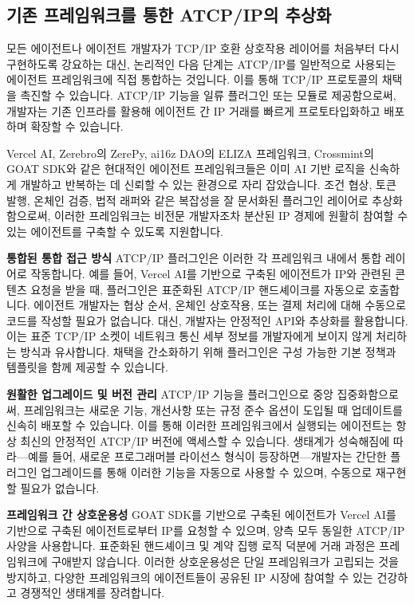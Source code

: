 \documentclass[journal,onecolumn]{IEEEtran} %
\begin{document}
\subsection{기존 프레임워크를 통한 ATCP/IP의 추상화}

모든 에이전트나 에이전트 개발자가 TCP/IP 호환 상호작용 레이어를 처음부터 다시 구현하도록 강요하는 대신, 논리적인 다음 단계는 ATCP/IP를 일반적으로 사용되는 에이전트 프레임워크에 직접 통합하는 것입니다. 이를 통해 TCP/IP 프로토콜의 채택을 촉진할 수 있습니다. ATCP/IP 기능을 일류 플러그인 또는 모듈로 제공함으로써, 개발자는 기존 인프라를 활용해 에이전트 간 IP 거래를 빠르게 프로토타입화하고 배포하며 확장할 수 있습니다.

Vercel AI\cite{ref8}, Zerebro의 ZerePy\cite{ref9}, ai16z DAO의 ELIZA 프레임워크\cite{ref7}, Crossmint의 GOAT SDK\cite{ref10}와 같은 현대적인 에이전트 프레임워크들은 이미 AI 기반 로직을 신속하게 개발하고 반복하는 데 신뢰할 수 있는 환경으로 자리 잡았습니다. 조건 협상, 토큰 발행, 온체인 검증, 법적 래퍼와 같은 복잡성을 잘 문서화된 플러그인 레이어로 추상화함으로써, 이러한 프레임워크는 비전문 개발자조차 분산된 IP 경제에 원활히 참여할 수 있는 에이전트를 구축할 수 있도록 지원합니다.


\noindent\textbf{통합된 통합 접근 방식}
ATCP/IP 플러그인은 이러한 각 프레임워크 내에서 통합 레이어로 작동합니다. 예를 들어, Vercel AI를 기반으로 구축된 에이전트가 IP와 관련된 콘텐츠 요청을 받을 때, 플러그인은 표준화된 ATCP/IP 핸드셰이크를 자동으로 호출합니다. 에이전트 개발자는 협상 순서, 온체인 상호작용, 또는 결제 처리에 대해 수동으로 코드를 작성할 필요가 없습니다. 대신, 개발자는 안정적인 API와 추상화를 활용합니다. 이는 표준 TCP/IP 소켓이 네트워크 통신 세부 정보를 개발자에게 보이지 않게 처리하는 방식과 유사합니다. 채택을 간소화하기 위해 플러그인은 구성 가능한 기본 정책과 템플릿을 함께 제공할 수 있습니다.

\noindent\textbf{원활한 업그레이드 및 버전 관리}
ATCP/IP 기능을 플러그인으로 중앙 집중화함으로써, 프레임워크는 새로운 기능, 개선사항 또는 규정 준수 옵션이 도입될 때 업데이트를 신속히 배포할 수 있습니다. 이를 통해 이러한 프레임워크에서 실행되는 에이전트는 항상 최신의 안정적인 ATCP/IP 버전에 액세스할 수 있습니다. 생태계가 성숙해짐에 따라—예를 들어, 새로운 프로그래머블 라이선스 형식이 등장하면—개발자는 간단한 플러그인 업그레이드를 통해 이러한 기능을 자동으로 사용할 수 있으며, 수동으로 재구현할 필요가 없습니다.

\noindent\textbf{프레임워크 간 상호운용성}
GOAT SDK를 기반으로 구축된 에이전트가 Vercel AI를 기반으로 구축된 에이전트로부터 IP를 요청할 수 있으며, 양측 모두 동일한 ATCP/IP 사양을 사용합니다. 표준화된 핸드셰이크 및 계약 집행 로직 덕분에 거래 과정은 프레임워크에 구애받지 않습니다. 이러한 상호운용성은 단일 프레임워크가 고립되는 것을 방지하고, 다양한 프레임워크의 에이전트들이 공유된 IP 시장에 참여할 수 있는 건강하고 경쟁적인 생태계를 장려합니다.
\end{document}
